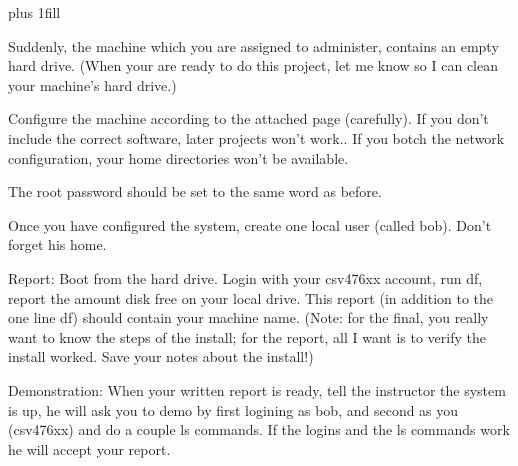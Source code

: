 
\rightskip=0pt plus 1fill

\parindent 0pt

Suddenly, the machine which you are assigned to administer,
contains an empty hard drive.
(When your are ready to do this project,
let me know so I can clean your machine's hard drive.)

Configure the machine according to the attached page (carefully).
If you don't include the correct software, later projects won't work..
If you botch the network configuration, your home directories won't
be available.

The root password should be set to the same word as before.

Once you have configured the system, create one local user (called bob).
Don't forget his home.

Report: Boot from the hard drive.
Login with your csv476xx account, run {\ltt{}df}, 
report the amount disk free on your local drive.
This report (in addition to the one line df) should contain your machine name.
(Note: for the final, you really want to know the steps of the install;
for the report, all I want is to verify the install worked.
Save your notes about the install!)

Demonstration:
When your written report is ready,
tell the instructor the system is up,
he will ask you to demo by first logining as {\ltt{}bob}, and second as
you (csv476xx) and do a couple {\ltt{}ls} commands.
If the logins and the {\ltt{}ls} commands work he will accept your report.
\bye
